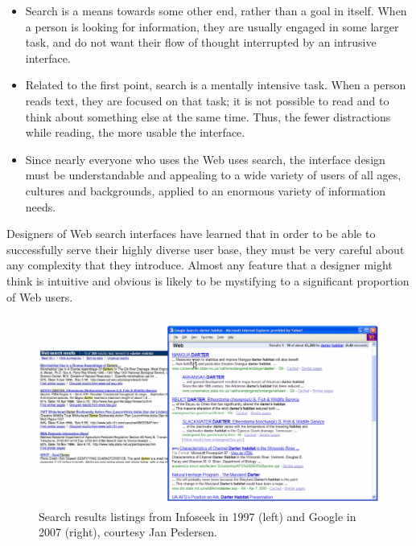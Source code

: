 \documentclass[sigconf,nonacm,screen,pbalance]{acmart}
\begin{document}
\begin{itemize}[leftmargin=1.5em,labelwidth=*]
    \item Search is a means towards some other end, rather than a goal in itself. When a person is looking for
    information, they are usually engaged in some larger task, and do not want their flow of thought
    interrupted by an intrusive interface.

\item Related to the first point, search is a mentally intensive task. When a person reads text, they are
    focused on that task; it is not possible to read and to think about something else at the same time.
    Thus, the fewer distractions while reading, the more usable the interface.

\item Since nearly everyone who uses the Web uses search, the interface design must be understandable and
    appealing to a wide variety of users of all ages, cultures and backgrounds, applied to an enormous
    variety of information needs. 
\end{itemize}

Designers of Web search interfaces have learned that in order to be able to successfully serve their
highly diverse user base, they must be very careful about any complexity that they introduce. Almost any
feature that a designer might think is intuitive and obvious is likely to be mystifying to a significant
proportion of Web users.

\begin{figure}[ht]
    \includegraphics[width=\columnwidth]{./infoseek_vs_google.png}
    \vspace{-20pt}
    \caption{Search results listings from Infoseek in 1997 (left) and Google in 2007 (right), courtesy Jan Pedersen.}
    \label{fig:figure-1}
    \vspace{-10pt}
\end{figure}
\end{document}
